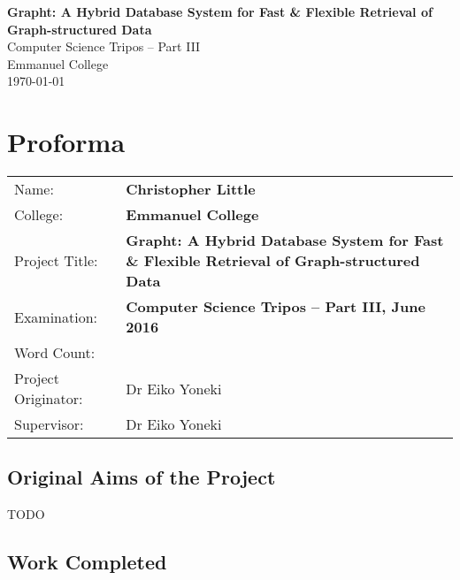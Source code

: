 \documentclass[12pt,a4paper,twoside,openright]{report}
\begin{document}


\pagestyle{empty}


\vspace*{60mm}
\begin{center}
\Huge
\textbf{Grapht: A Hybrid Database System for Fast \& 
  Flexible Retrieval of Graph-structured Data} \\[5mm]
Computer Science Tripos -- Part III \\[5mm]
Emmanuel College \\[5mm]
\today  %
\end{center}


\pagestyle{plain}

\chapter*{Proforma}

{\large
\begin{tabular}{ll}
Name:               & \bf Christopher Little 			\\
College:            & \bf Emmanuel College              \\
Project Title:      & \bf Grapht: A Hybrid Database System for 
						Fast \& Flexible Retrieval of Graph-structured Data \\
Examination:        & \bf Computer Science Tripos -- Part III, June 2016  \\
Word Count:         & \bf \footnotemark[1]  		\\
Project Originator: & Dr Eiko Yoneki                    \\
Supervisor:         & Dr Eiko Yoneki 					\\ 
\end{tabular}
}


\section*{Original Aims of the Project}

{\Large TODO}
\section*{Work Completed}
\end{document}
